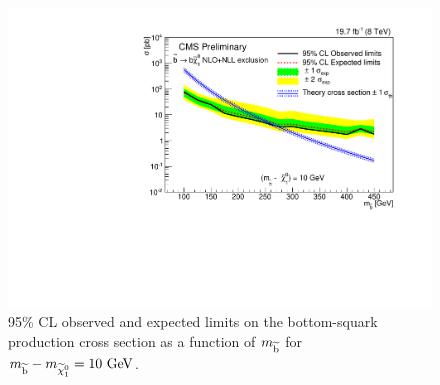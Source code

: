 \begin{figure}[!Hhtb]
  \begin{center}
  \includegraphics[scale=0.39]{Figures/sus13009/limitplots/plots/sbottom/Limit_susy_sbottom_10.pdf}
  \caption{95\% CL observed and expected limits on the bottom-squark production cross section as a function of $m_{\widetilde{{\rm b}}}$ for $m_{\widetilde{{\rm b}}} - m_{\widetilde{\chi}^{0}_{1}} = 10~\mathrm{GeV}$.}
  \label{fig:sbottom_10GeV}
  \end{center}
\end{figure}

